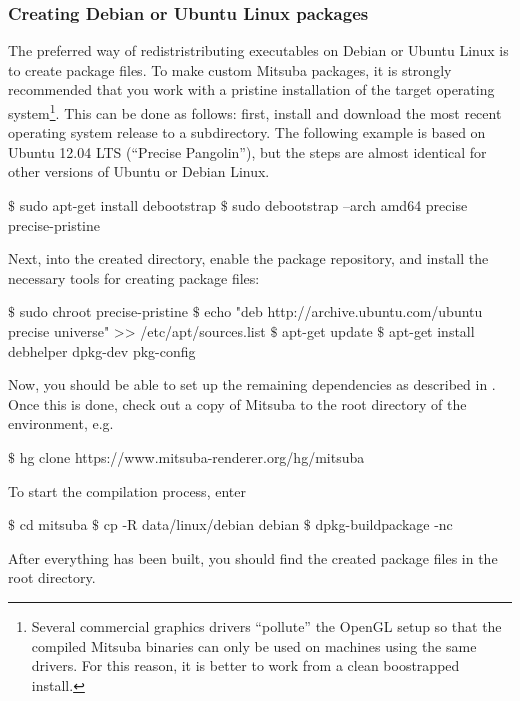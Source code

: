 \subsubsection{Creating Debian or Ubuntu Linux packages}
The preferred way of redistristributing executables on Debian or Ubuntu Linux is to create
 package files. To make custom Mitsuba packages, it is strongly recommended
that you work with a pristine installation of the target operating system\footnote{Several commercial graphics
drivers ``pollute'' the OpenGL setup so that the compiled Mitsuba binaries
can only be used on machines using the same drivers. For this reason, it is
better to work from a clean boostrapped install.}. This can be done as follows:
first, install  and download the most recent operating system release
to a subdirectory. The following example is based on Ubuntu 12.04 LTS (``Precise Pangolin''),
but the steps are almost identical for other versions of Ubuntu or Debian Linux.
\begin{shell}
$\text{\$}$ sudo apt-get install debootstrap
$\text{\$}$ sudo debootstrap --arch amd64 precise precise-pristine
\end{shell}
Next,  into the created directory, enable the  package repository,
and install the necessary tools for creating package files:
\begin{shell}
$\text{\$}$ sudo chroot precise-pristine
$\text{\$}$ echo "deb http://archive.ubuntu.com/ubuntu precise universe" >> /etc/apt/sources.list
$\text{\$}$ apt-get update
$\text{\$}$ apt-get install debhelper dpkg-dev pkg-config
\end{shell}
Now, you should be able to set up the remaining dependencies as described in .
Once this is done, check out a copy of Mitsuba to the root directory of the  environment, e.g.
\begin{shell}
$\text{\$}$ hg clone https://www.mitsuba-renderer.org/hg/mitsuba
\end{shell}
To start the compilation process, enter
\begin{shell}
$\text{\$}$ cd mitsuba
$\text{\$}$ cp -R data/linux/debian debian
$\text{\$}$ dpkg-buildpackage -nc
\end{shell}
After everything has been built, you should find the created package files
in the root directory.
